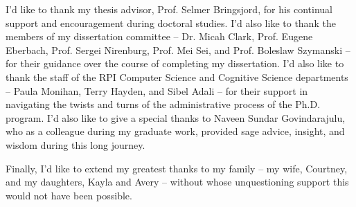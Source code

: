  

I'd like to thank my thesis advisor, Prof. Selmer Bringsjord, for his continual support and encouragement during doctoral studies.  I'd also like to thank the members of my dissertation committee -- Dr. Micah Clark, Prof. Eugene Eberbach, Prof. Sergei Nirenburg, Prof. Mei Sei, and Prof. Boleslaw Szymanski -- for their guidance over the course of completing my dissertation.  I'd also like to thank the staff of the RPI Computer Science and Cognitive Science departments -- Paula Monihan, Terry Hayden, and Sibel Adali -- for their support in navigating the twists and turns of the administrative process of the Ph.D. program.  I'd also like to give a special thanks to Naveen Sundar Govindarajulu, who as a colleague during my graduate work, provided sage advice, insight, and wisdom during this long journey.

Finally, I'd like to extend my greatest thanks to my family -- my wife, Courtney, and my daughters, Kayla and Avery -- without whose unquestioning support this would not have been possible.